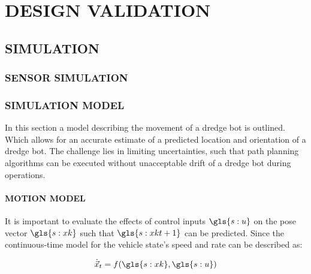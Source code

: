\chapter{DESIGN VALIDATION}\label{chap:design validation}


\section{SIMULATION}\label{sec:simulation}

\subsection{SENSOR SIMULATION}\label{sec:sensor simulation}


\subsection{SIMULATION MODEL}\label{sec:simulation model}


In this section a model describing the movement of a dredge bot is outlined. Which allows for an accurate estimate of a predicted location and orientation of a \gls{dredge bot}. The challenge lies in limiting uncertainties, such that path planning algorithms can be executed without unacceptable drift of a \gls{dredge bot} during operations.

\subsubsection{MOTION MODEL}\label{sec:motion model}
It is important to evaluate the effects of control inputs $ \gls{s:u} $  on the pose vector $ \gls{s:xk} $ such that $ \gls{s:xkt+1} $ can be predicted. Since the continuous-time model for the vehicle state's speed and rate can be described as:

\begin{sBox}
	\begin{equation}\label{eq:motionmodel}
		\dot{\vec{x}}_t = f(\gls{s:xk},\gls{s:u})
	\end{equation}
\end{sBox}

